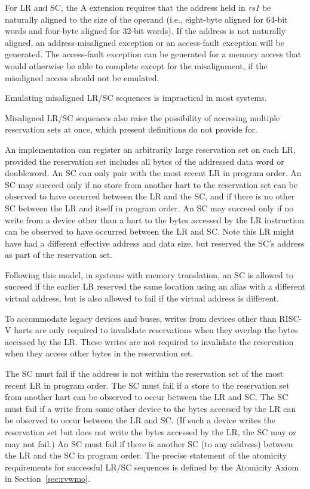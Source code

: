 For LR and SC, the A extension requires that the address held in {\em
  rs1} be naturally aligned to the size of the operand (i.e.,
eight-byte aligned for 64-bit words and four-byte aligned for 32-bit
words).  If the address is not naturally aligned, an address-misaligned
exception or an access-fault exception will be generated.  The access-fault
exception can be generated for a memory access that would otherwise be
able to complete except for the misalignment, if the misaligned access
should not be emulated.

\begin{commentary}
Emulating misaligned LR/SC sequences is impractical in most systems.

Misaligned LR/SC sequences also raise the possibility of accessing multiple
reservation sets at once, which present definitions do not provide for.
\end{commentary}

An implementation can register an arbitrarily large reservation set on each
LR, provided the reservation set includes all bytes of the addressed data word
or doubleword.
An SC can only pair with the most recent LR in program order.
An SC may succeed only if no store from another hart
to the reservation set can be observed to have occurred between the LR
and the SC, and if there is no other SC between the LR and itself in program
order.
An SC may succeed only if no write from a device other than a hart
to the bytes accessed by the LR instruction can be observed to have occurred
between the LR and SC.
Note this LR might have had a different effective address and data size, but
reserved the SC's address as part of the reservation set.
\begin{commentary}
Following this model, in systems with memory translation, an SC is allowed to
succeed if the earlier LR reserved the same location using an alias with
a different virtual address, but is also allowed to fail if the virtual
address is different.
\end{commentary}
\begin{commentary}
To accommodate legacy devices and buses, writes from devices other than RISC-V
harts are only required to invalidate reservations when they overlap the bytes
accessed by the LR.  These writes are not required to invalidate the
reservation when they access other bytes in the reservation set.
\end{commentary}

The SC must fail if the address is not within the reservation set of the most
recent LR in program order.
The SC must fail if a store to the reservation set from another hart can be
observed to occur between the LR and SC.
The SC must fail if a write from some other device to the bytes accessed by
the LR can be observed to occur between the LR and SC.
(If such a device writes the reservation set but does not write the bytes
accessed by the LR, the SC may or may not fail.)
An SC must fail if there is another SC (to any address) between the LR and the
SC in program order.
The precise statement of the atomicity requirements for successful LR/SC
sequences is defined by the Atomicity Axiom in Section~\ref{sec:rvwmo}.

